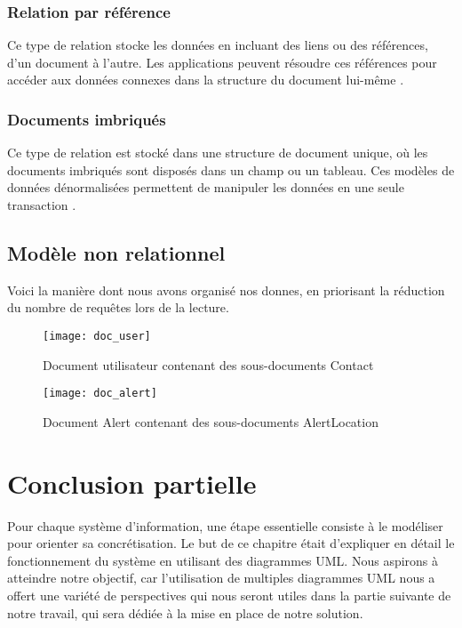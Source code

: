 \subsubsection{Relation par référence}
Ce type de relation stocke les données en incluant des liens ou des références, d'un document à l'autre. Les applications peuvent résoudre ces références pour accéder aux données connexes dans la structure du document lui-même \cite{harley_vera_data}.
\subsubsection{Documents imbriqués}
Ce type de relation est stocké dans une structure de document unique, où les documents imbriqués sont disposés dans un champ ou un tableau. Ces modèles de données dénormalisées permettent de manipuler les données en une seule transaction \cite{harley_vera_data}.

\subsection{Modèle non relationnel}
Voici la manière dont nous avons organisé nos donnes, en priorisant la réduction du nombre de requêtes lors de la lecture.

\begin{figure}[H]
	\centering
	\texttt{[image: doc\_user]}
	\caption{Document utilisateur contenant des sous-documents Contact}
\end{figure}

\begin{figure}[H]
	\centering
	\texttt{[image: doc\_alert]}
	\caption{Document Alert contenant des sous-documents AlertLocation}
\end{figure}

\section{Conclusion partielle}
Pour chaque système d'information, une étape essentielle consiste à le modéliser pour orienter sa concrétisation. Le but de ce chapitre était d'expliquer en détail le fonctionnement du système en utilisant des diagrammes UML. Nous aspirons à atteindre notre objectif, car l'utilisation de multiples diagrammes UML nous a offert une variété de perspectives qui nous seront utiles dans la partie suivante de notre travail, qui sera dédiée à la mise en place de notre solution.


